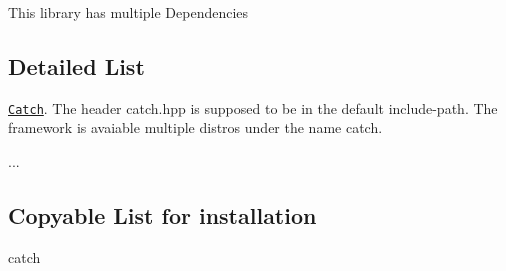 This library has multiple Dependencies

\subsection*{Detailed List }


\begin{DoxyItemize}
\item \href{https://github.com/philsquared/Catch}{\tt Catch}. The header {\ttfamily catch.\+hpp} is supposed to be in the default include-\/path. The framework is avaiable multiple distros under the name {\ttfamily catch}.
\item ...
\end{DoxyItemize}

\subsection*{Copyable List for installation }


\begin{DoxyCode}
catch
\end{DoxyCode}
 